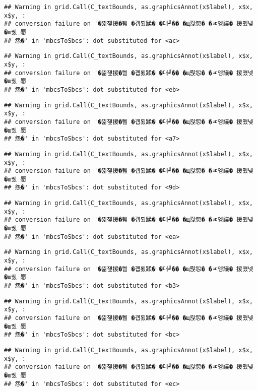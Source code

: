 \documentclass[
]{article}
\begin{document}
\begin{verbatim}
## Warning in grid.Call(C_textBounds, as.graphicsAnnot(x$label), x$x, x$y, :
## conversion failure on '�낆쟾援�쁾 �곕룄蹂� �대┛�� �щ쭩怨� �ㅼ엥議� 援먰넻�ш퀬 愿
## 怨�' in 'mbcsToSbcs': dot substituted for <ac>
\end{verbatim}

\begin{verbatim}
## Warning in grid.Call(C_textBounds, as.graphicsAnnot(x$label), x$x, x$y, :
## conversion failure on '�낆쟾援�쁾 �곕룄蹂� �대┛�� �щ쭩怨� �ㅼ엥議� 援먰넻�ш퀬 愿
## 怨�' in 'mbcsToSbcs': dot substituted for <eb>
\end{verbatim}

\begin{verbatim}
## Warning in grid.Call(C_textBounds, as.graphicsAnnot(x$label), x$x, x$y, :
## conversion failure on '�낆쟾援�쁾 �곕룄蹂� �대┛�� �щ쭩怨� �ㅼ엥議� 援먰넻�ш퀬 愿
## 怨�' in 'mbcsToSbcs': dot substituted for <a7>
\end{verbatim}

\begin{verbatim}
## Warning in grid.Call(C_textBounds, as.graphicsAnnot(x$label), x$x, x$y, :
## conversion failure on '�낆쟾援�쁾 �곕룄蹂� �대┛�� �щ쭩怨� �ㅼ엥議� 援먰넻�ш퀬 愿
## 怨�' in 'mbcsToSbcs': dot substituted for <9d>
\end{verbatim}

\begin{verbatim}
## Warning in grid.Call(C_textBounds, as.graphicsAnnot(x$label), x$x, x$y, :
## conversion failure on '�낆쟾援�쁾 �곕룄蹂� �대┛�� �щ쭩怨� �ㅼ엥議� 援먰넻�ш퀬 愿
## 怨�' in 'mbcsToSbcs': dot substituted for <ea>
\end{verbatim}

\begin{verbatim}
## Warning in grid.Call(C_textBounds, as.graphicsAnnot(x$label), x$x, x$y, :
## conversion failure on '�낆쟾援�쁾 �곕룄蹂� �대┛�� �щ쭩怨� �ㅼ엥議� 援먰넻�ш퀬 愿
## 怨�' in 'mbcsToSbcs': dot substituted for <b3>
\end{verbatim}

\begin{verbatim}
## Warning in grid.Call(C_textBounds, as.graphicsAnnot(x$label), x$x, x$y, :
## conversion failure on '�낆쟾援�쁾 �곕룄蹂� �대┛�� �щ쭩怨� �ㅼ엥議� 援먰넻�ш퀬 愿
## 怨�' in 'mbcsToSbcs': dot substituted for <bc>
\end{verbatim}

\begin{verbatim}
## Warning in grid.Call(C_textBounds, as.graphicsAnnot(x$label), x$x, x$y, :
## conversion failure on '�낆쟾援�쁾 �곕룄蹂� �대┛�� �щ쭩怨� �ㅼ엥議� 援먰넻�ш퀬 愿
## 怨�' in 'mbcsToSbcs': dot substituted for <ec>
\end{verbatim}
\end{document}
